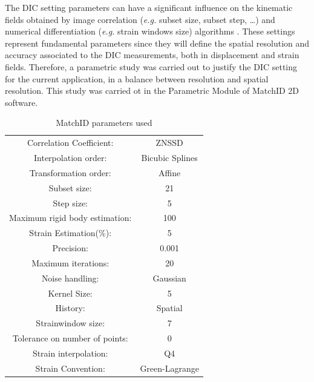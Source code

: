The DIC setting parameters can have a significant influence on the kinematic fields obtained by image correlation (\textit{e.g.} subset size, subset step, \ldots) and numerical differentiation (\textit{e.g.} strain windows size) algorithms \cite{Pereira2018566}. These settings represent fundamental parameters since they will define the spatial resolution and accuracy associated to the DIC measurements, both in displacement and strain fields.  Therefore, a parametric study was carried out to justify the DIC setting for the current
application, in a balance between resolution and spatial resolution. This study was carried ot in the Parametric Module of MatchID 2D software.
\begin{table}[]
	\centering
	\begin{tabular}{c c}
		\hline
		Correlation   Coefficient: & ZNSSD \\ 
		Interpolation order: & Bicubic Splines \\ 
		Transformation order: & Affine \\
		Subset size: & 21 \\
		Step size: & 5 \\
		Maximum rigid body estimation: & 100 \\ 
		Strain Estimation(\%): & 5 \\ 
		Precision: & 0.001 \\ 
		Maximum iterations: & 20 \\ 
		Noise handling: & Gaussian \\ 
		Kernel Size: & 5 \\ 
		History: & Spatial \\ 
		Strainwindow size: & 7 \\ 
		Tolerance on number of points: & 0 \\ 
		Strain interpolation: & Q4 \\ 
		Strain Convention: & Green-Lagrange \\ \hline
	\end{tabular}
	\caption{MatchID parameters used}
	\label{tab:MatchID_param}
\end{table}
